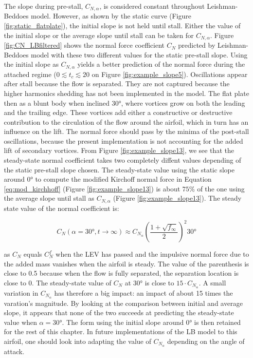 The slope during pre-stall, $C_{N,\alpha}$, is considered constant throughout Leishman-Beddoes model. However, as shown by the static curve (Figure \ref{fig:static_flatplate}), the initial slope is not held until stall. 
Either the value of the initial slope or the average slope until stall can be taken for $C_{N,\alpha}$. Figure \ref{fig:CN_LBfiltered} shows the normal force coefficient $C_N$ predicted by Leishman-Beddoes model with these two different values for the static pre-stall slope. Using the initial slope as $C_{N,\alpha}$ yields a better prediction of the normal force during the attached regime ($0 \lesssim t_c \lesssim 20$ on Figure \ref{fig:example_slope5}).
Oscillations appear after stall because the flow is separated. They are not captured because the higher harmonics shedding has not been implemented in the model. The flat plate then as a blunt body when inclined $\ang{30}$, where vortices grow on both the leading and the trailing edge. These vortices add either a constructive or destructive contribution to the circulation of the flow around the airfoil, which in turn has an influence on the lift. The normal force  should pass by the minima of the post-stall oscillations, because the present implementation is not accounting for the added lift of secondary vortices. From Figure \ref{fig:example_slope13}, we see that the steady-state normal coefficient takes two completely diffent values depending of the static pre-stall slope chosen. 
The steady-state value using the static slope around $\ang{0}$  to compute the modified Kirchoff normal force in Equation \eqref{eq:mod_kirchhoff} (Figure \ref{fig:example_slope13}) is about $75 \%$ of the one using the average slope until stall as $C_{N,\alpha}$ (Figure \ref{fig:example_slope13}). The steady state value of the normal coefficient is: 

\begin{equation}
    C_N(\alpha=\ang{30}, t \rightarrow \infty) \approx C_{N_{\alpha}}\left(\frac{1+\sqrt{f_\infty}}{2}\right)^{2} \ang{30}
    \label{eq:CN_LB_steady_state}
\end{equation}

\noindent as $C_N$ equals $C_N^f$ when the LEV has passed and the impulsive normal force due to the added mass vanishes when the airfoil is steady. The value of the parenthesis is close to 0.5 because when the flow is fully separated, the separation location is close to 0. The steady-state value of $C_N$ at $\ang{30}$ is close to $15 \cdot C_{N_\alpha}$. A small variation in $C_{N_\alpha}$ has therefore
a big impact: an impact of about 15 times the varation's magnitude. By looking at the comparison between initial and average slope, it appears that none of the two succeeds at predicting the steady-state value when $\alpha=\ang{30}$. The form using the initial slope around $\ang{0}$ is then retained for the rest of this chapter. In future implementations of the LB model to this airfoil, one should look into adapting the value of $C_{N_\alpha}$ depending on the angle of attack. 

